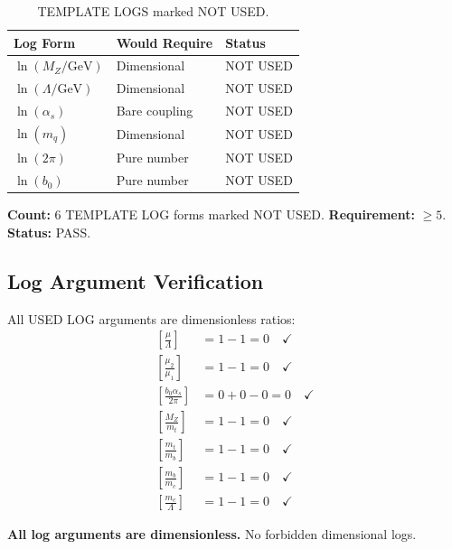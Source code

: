 \documentclass[11pt,a4paper]{article}
\theoremstyle{definition}
\begin{document}
\begin{table}[ht]
\centering
\caption{TEMPLATE LOGS marked NOT USED.}
\label{tab:template-logs}
\begin{tabular}{lll}
\toprule
Log Form & Would Require & Status \\
\midrule
$\ln(M_Z/\text{GeV})$ & Dimensional & NOT USED \\
$\ln(\Lambda/\text{GeV})$ & Dimensional & NOT USED \\
$\ln(\alpha_s)$ & Bare coupling & NOT USED \\
$\ln(m_q)$ & Dimensional & NOT USED \\
$\ln(2\pi)$ & Pure number & NOT USED \\
$\ln(b_0)$ & Pure number & NOT USED \\
\bottomrule
\end{tabular}
\end{table}

\textbf{Count:} 6 TEMPLATE LOG forms marked NOT USED. \textbf{Requirement:} $\geq 5$. \textbf{Status:} PASS.

\subsection{Log Argument Verification}
\label{subsec:log-verify}

All USED LOG arguments are dimensionless ratios:
\begin{align}
\label{eq:log-dim-1}
\left[\frac{\mu}{\Lambda}\right] &= 1 - 1 = 0 \quad \checkmark \\
\label{eq:log-dim-2}
\left[\frac{\mu_2}{\mu_1}\right] &= 1 - 1 = 0 \quad \checkmark \\
\label{eq:log-dim-3}
\left[\frac{b_0\alpha_s}{2\pi}\right] &= 0 + 0 - 0 = 0 \quad \checkmark \\
\label{eq:log-dim-4}
\left[\frac{M_Z}{m_t}\right] &= 1 - 1 = 0 \quad \checkmark \\
\label{eq:log-dim-5}
\left[\frac{m_t}{m_b}\right] &= 1 - 1 = 0 \quad \checkmark \\
\label{eq:log-dim-6}
\left[\frac{m_b}{m_c}\right] &= 1 - 1 = 0 \quad \checkmark \\
\label{eq:log-dim-7}
\left[\frac{m_c}{\Lambda}\right] &= 1 - 1 = 0 \quad \checkmark
\end{align}

\textbf{All log arguments are dimensionless.} No forbidden dimensional logs.

\end{document}
